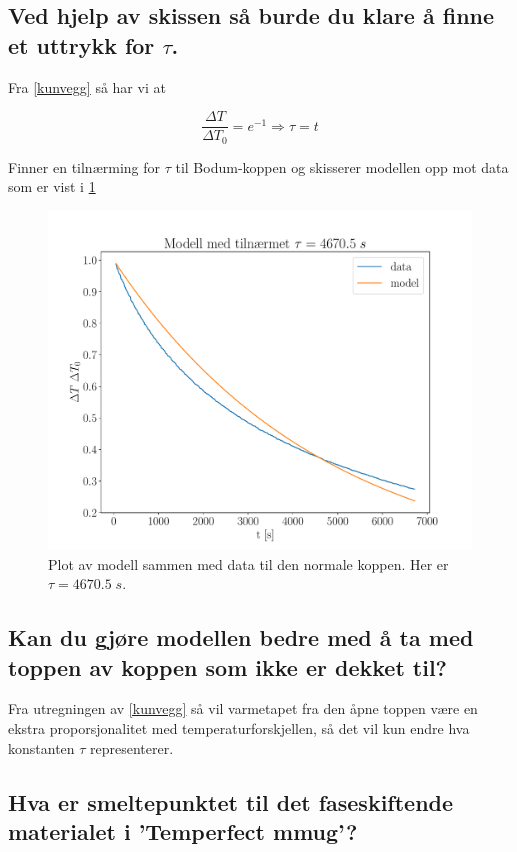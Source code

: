 \documentclass[ reprint, amsmath,amssymb, aps]{revtex4-2}
\begin{document}
\subsection*{Ved hjelp av skissen så burde du klare å finne et uttrykk for $\tau$.}

Fra \ref{kunvegg} så har vi at

$$\frac{\Delta T}{\Delta T_0} = e^{-1} \Rightarrow \tau = t$$

Finner en tilnærming for $\tau$ til Bodum-koppen og skisserer modellen opp mot data som er vist i \ref{plotm1}

\begin{figure}
\centering
\includegraphics[scale=0.35]{modellttau.pdf}
\caption{Plot av modell sammen med data til den normale koppen. Her er $\tau = 4670.5 \; s$.}
\label{plotm1}
\end{figure}

\subsection*{Kan du gjøre modellen bedre med å ta med toppen av koppen som ikke er dekket til?}

Fra utregningen av \ref{kunvegg} så vil varmetapet fra den åpne toppen være en ekstra proporsjonalitet med temperaturforskjellen, så det vil kun endre hva konstanten $\tau$ representerer.

\subsection*{Hva er smeltepunktet til det faseskiftende materialet i 'Temperfect mmug'?}
\end{document}

